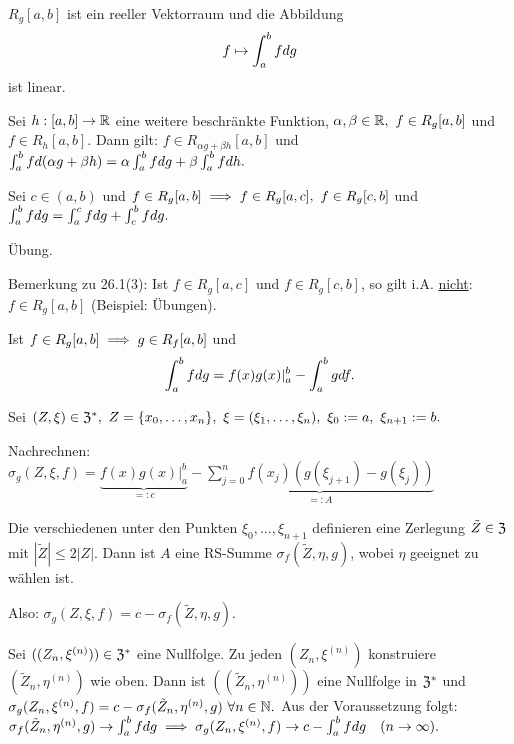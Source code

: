 \documentclass[a4paper,oneside,DIV15,BCOR12mm]{scrbook}
\begin{document}
\begin{satz}
\begin{liste}
\item $R_g[a,b]$ ist ein reeller Vektorraum und die Abbildung $$f \mapsto \intab* fdg$$ ist linear.
\item Sei $h:[a,b] \to \mathbb{R}$ eine weitere beschränkte Funktion, $\alpha,\beta \in \MdR,\ f \in R_g[a,b]$ und $f \in R_h[a,b]$. Dann gilt: $f \in R_{\alpha g + \beta h}[a,b]$ und $\intab* fd(\alpha g + \beta h) = \alpha \intab* fdg + \beta \intab* fdh.$
\item Sei $c \in (a,b)$ und $f \in R_g[a,b] \implies f \in R_g[a,c],\ f \in R_g[c,b]$ und $\intab* fdg = \int_a^c fdg + \int_c^b fdg.$
\end{liste}
\end{satz}

\begin{beweis}
Übung.
\end{beweis}

Bemerkung zu 26.1(3): Ist $f \in R_g[a,c]$ und $f \in R_g[c,b]$, so gilt i.A. \underline{nicht}: $f \in R_g[a,b]$ (Beispiel: Übungen).

\begin{satz}
Ist $f \in R_g[a,b] \implies g \in R_f[a,b]$ und $$\intab* fdg = f(x)g(x)|_a^b - \intab* gdf.$$
\end{satz}

\begin{beweis}
Sei $(Z,\xi) \in \mathfrak{Z}^*,\ Z = \{x_0,\ldots,x_n\},\ \xi = (\xi_1,\ldots,\xi_n),\ \xi_0 := a,\ \xi_{n+1} := b.$

Nachrechnen: $\sigma_g(Z,\xi,f) = \underbrace{f(x)g(x)|_a^b}_{=:c} - \underbrace{\sum_{j=0}^n f(x_j)(g(\xi_{j+1}) - g(\xi_j))}_{=:A}$

Die verschiedenen unter den Punkten $\xi_0,\ldots,\xi_{n+1}$ definieren eine Zerlegung $\tilde{Z} \in \mathfrak{Z}$ mit $|\tilde{Z}| \le 2|Z|$. Dann ist $A$ eine RS-Summe $\sigma_f(\tilde{Z},\eta,g)$, wobei $\eta$ geeignet zu wählen ist.

Also: $\sigma_g(Z,\xi,f) = c - \sigma_f(\tilde{Z},\eta,g).$

Sei $((Z_n,\xi^{(n)})) \in \mathfrak{Z}^*$ eine Nullfolge. Zu jeden $(Z_n,\xi^{(n)})$ konstruiere $(\tilde{Z}_n,\eta^{(n)})$ wie oben. Dann ist $((\tilde{Z}_n,\eta^{(n)}))$ eine Nullfolge in $\mathfrak{Z}^*$ und $\sigma_g(Z_n,\xi^{(n)},f) = c - \sigma_f(\tilde{Z}_n,\eta^{(n)},g)\ \forall n \in \mathbb{N}.$ Aus der Voraussetzung folgt: $\sigma_f(\tilde{Z}_n,\eta^{(n)},g) \to \intab* fdg \folgt \sigma_g(Z_n,\xi^{(n)},f) \to c - \intab* fdg\quad (n \to \infty).$
\end{beweis}
\end{document}
